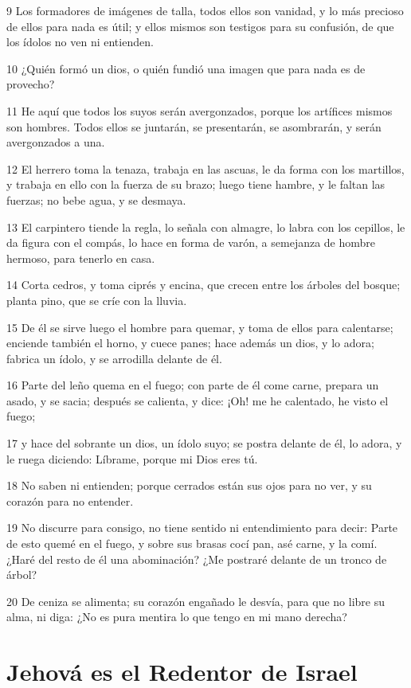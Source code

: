 \par 9 Los formadores de imágenes de talla, todos ellos son vanidad, y lo más precioso de ellos para nada es útil; y ellos mismos son testigos para su confusión, de que los ídolos no ven ni entienden.
\par 10 ¿Quién formó un dios, o quién fundió una imagen que para nada es de provecho?
\par 11 He aquí que todos los suyos serán avergonzados, porque los artífices mismos son hombres. Todos ellos se juntarán, se presentarán, se asombrarán, y serán avergonzados a una.
\par 12 El herrero toma la tenaza, trabaja en las ascuas, le da forma con los martillos, y trabaja en ello con la fuerza de su brazo; luego tiene hambre, y le faltan las fuerzas; no bebe agua, y se desmaya.
\par 13 El carpintero tiende la regla, lo señala con almagre, lo labra con los cepillos, le da figura con el compás, lo hace en forma de varón, a semejanza de hombre hermoso, para tenerlo en casa.
\par 14 Corta cedros, y toma ciprés y encina, que crecen entre los árboles del bosque; planta pino, que se críe con la lluvia.
\par 15 De él se sirve luego el hombre para quemar, y toma de ellos para calentarse; enciende también el horno, y cuece panes; hace además un dios, y lo adora; fabrica un ídolo, y se arrodilla delante de él.
\par 16 Parte del leño quema en el fuego; con parte de él come carne, prepara un asado, y se sacia; después se calienta, y dice: ¡Oh! me he calentado, he visto el fuego;
\par 17 y hace del sobrante un dios, un ídolo suyo; se postra delante de él, lo adora, y le ruega diciendo: Líbrame, porque mi Dios eres tú.
\par 18 No saben ni entienden; porque cerrados están sus ojos para no ver, y su corazón para no entender.
\par 19 No discurre para consigo, no tiene sentido ni entendimiento para decir: Parte de esto quemé en el fuego, y sobre sus brasas cocí pan, asé carne, y la comí. ¿Haré del resto de él una abominación? ¿Me postraré delante de un tronco de árbol?
\par 20 De ceniza se alimenta; su corazón engañado le desvía, para que no libre su alma, ni diga: ¿No es pura mentira lo que tengo en mi mano derecha?

\section*{Jehová es el Redentor de Israel}

